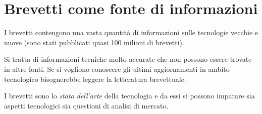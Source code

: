 \section{Brevetti come fonte di informazioni}
I brevetti contengono una vasta quantità di informazioni sulle tecnologie vecchie e nuove (sono stati pubblicati quasi 100 milioni di brevetti).

Si tratta di informazioni tecniche molto accurate che non possono essere trovate in altre fonti. Se si vogliono conoscere gli ultimi aggiornamenti in ambito tecnologico bisognerebbe leggere la letteratura brevettuale.

I brevetti sono lo \textit{stato dell'arte} della tecnologia e da essi si possono imparare sia aspetti tecnologici sia questioni di analisi di mercato. 
